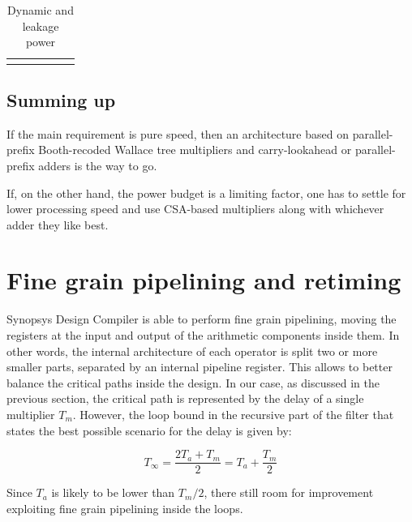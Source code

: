 \documentclass[a4paper]{article}
\begin{document}
\begin{table}[hbtp]
\begin{tabular}{clllll}
																			 &                                                    &                                                                          &                                                                          &                                                                          &
	\end{tabular}
	\caption{Dynamic and leakage power}
	\label{tab:pwr}
\end{table}

\subsection{Summing up}
If the main requirement is pure speed, then an architecture based on parallel-prefix Booth-recoded Wallace tree multipliers and carry-lookahead or parallel-prefix adders is the way to go.

If, on the other hand, the power budget is a limiting factor, one has to settle for lower processing speed and use CSA-based multipliers along with whichever adder they like best.

\section{Fine grain pipelining and retiming}
Synopsys Design Compiler is able to perform fine grain pipelining, moving the registers at the input and output of the arithmetic components inside them. In other words, the internal architecture of each operator is split two or more smaller parts, separated by an internal pipeline register. This allows to better balance the critical paths inside the design. In our case, as discussed in the previous section, the critical path is represented by the delay of a single multiplier $T_m$. However, the loop bound in the recursive part of the filter that states the best possible scenario for the delay is given by:

\begin{equation*}
	T_\infty = \frac{2T_a + T_m}{2} = T_a + \frac{T_m}{2}
\end{equation*}

Since $T_a$ is likely to be lower than $T_m/2$, there still room for improvement exploiting fine grain pipelining inside the loops. 
\end{document}
